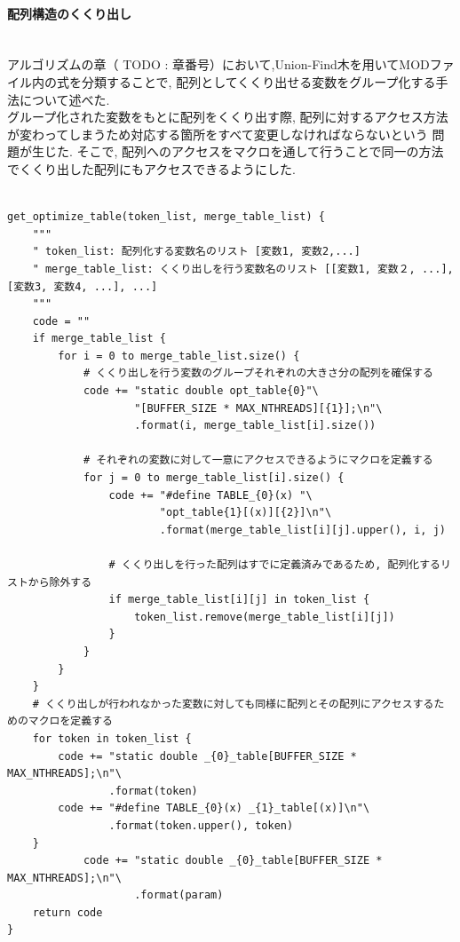 \paragraph{配列構造のくくり出し}~\\
アルゴリズムの章（ TODO : 章番号）において,Union-Find木を用いてMODファイル内の式を分類することで,
配列としてくくり出せる変数をグループ化する手法について述べた.\\
グループ化された変数をもとに配列をくくり出す際, 配列に対するアクセス方法が変わってしまうため対応する箇所をすべて変更しなければならないという
問題が生じた. そこで, 配列へのアクセスをマクロを通して行うことで同一の方法でくくり出した配列にもアクセスできるようにした.\\
{\footnotesize
\begin{lstlisting}[caption=計算式内の変数の配列化,label=obtain-vars,numbers=none]

get_optimize_table(token_list, merge_table_list) {
    """
    " token_list: 配列化する変数名のリスト [変数1, 変数2,...]
    " merge_table_list: くくり出しを行う変数名のリスト [[変数1, 変数２, ...], [変数3, 変数4, ...], ...]
    """
    code = ""
    if merge_table_list {
        for i = 0 to merge_table_list.size() {
            # くくり出しを行う変数のグループそれぞれの大きさ分の配列を確保する
            code += "static double opt_table{0}"\
                    "[BUFFER_SIZE * MAX_NTHREADS][{1}];\n"\
                    .format(i, merge_table_list[i].size())

            # それぞれの変数に対して一意にアクセスできるようにマクロを定義する
            for j = 0 to merge_table_list[i].size() {
                code += "#define TABLE_{0}(x) "\
                        "opt_table{1}[(x)][{2}]\n"\
                        .format(merge_table_list[i][j].upper(), i, j)

                # くくり出しを行った配列はすでに定義済みであるため, 配列化するリストから除外する
                if merge_table_list[i][j] in token_list {
                    token_list.remove(merge_table_list[i][j])
                }
            }
        }
    }
    # くくり出しが行われなかった変数に対しても同様に配列とその配列にアクセスするためのマクロを定義する
    for token in token_list {
        code += "static double _{0}_table[BUFFER_SIZE * MAX_NTHREADS];\n"\
                .format(token)
        code += "#define TABLE_{0}(x) _{1}_table[(x)]\n"\
                .format(token.upper(), token)
    }
            code += "static double _{0}_table[BUFFER_SIZE * MAX_NTHREADS];\n"\
                    .format(param)
    return code
}


\end{lstlisting}}
